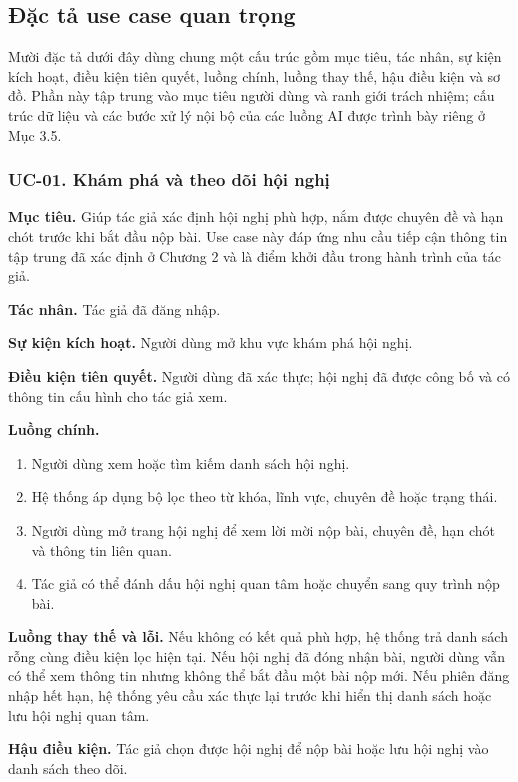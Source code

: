 \subsection{Đặc tả use case quan trọng}

Mười đặc tả dưới đây dùng chung một cấu trúc gồm mục tiêu, tác nhân, sự kiện kích hoạt, điều kiện tiên quyết, luồng chính, luồng thay thế, hậu điều kiện và sơ đồ. Phần này tập trung vào mục tiêu người dùng và ranh giới trách nhiệm; cấu trúc dữ liệu và các bước xử lý nội bộ của các luồng AI được trình bày riêng ở Mục 3.5.

\subsubsection{UC-01. Khám phá và theo dõi hội nghị}

\textbf{Mục tiêu.} Giúp tác giả xác định hội nghị phù hợp, nắm được chuyên đề và hạn chót trước khi bắt đầu nộp bài. Use case này đáp ứng nhu cầu tiếp cận thông tin tập trung đã xác định ở Chương 2 và là điểm khởi đầu trong hành trình của tác giả.

\textbf{Tác nhân.} Tác giả đã đăng nhập.

\textbf{Sự kiện kích hoạt.} Người dùng mở khu vực khám phá hội nghị.

\textbf{Điều kiện tiên quyết.} Người dùng đã xác thực; hội nghị đã được công bố và có thông tin cấu hình cho tác giả xem.

\textbf{Luồng chính.}

\begin{enumerate}
  \item Người dùng xem hoặc tìm kiếm danh sách hội nghị.
  \item Hệ thống áp dụng bộ lọc theo từ khóa, lĩnh vực, chuyên đề hoặc trạng thái.
  \item Người dùng mở trang hội nghị để xem lời mời nộp bài, chuyên đề, hạn chót và thông tin liên quan.
  \item Tác giả có thể đánh dấu hội nghị quan tâm hoặc chuyển sang quy trình nộp bài.
\end{enumerate}

\textbf{Luồng thay thế và lỗi.} Nếu không có kết quả phù hợp, hệ thống trả danh sách rỗng cùng điều kiện lọc hiện tại. Nếu hội nghị đã đóng nhận bài, người dùng vẫn có thể xem thông tin nhưng không thể bắt đầu một bài nộp mới. Nếu phiên đăng nhập hết hạn, hệ thống yêu cầu xác thực lại trước khi hiển thị danh sách hoặc lưu hội nghị quan tâm.

\textbf{Hậu điều kiện.} Tác giả chọn được hội nghị để nộp bài hoặc lưu hội nghị vào danh sách theo dõi.

